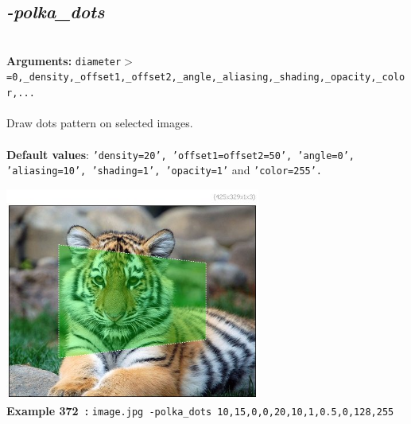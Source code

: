 \documentclass[a4paper,11pt,twoside]{book}
\begin{document}
\subsection{\emph{-polka\_dots} }\vspace*{-0.5em}
~\\\textbf{Arguments: } 
{\small \texttt{diameter$>$=0,\_density,\_offset1,\_offset2,\_angle,\_aliasing,\_shading,\_opacity,\_color,...}}\\~\\
Draw dots pattern on selected images.
~\\~\\\textbf{Default values}: {\small \texttt{'density=20', 'offset1=offset2=50', 'angle=0', 'aliasing=10', 'shading=1', 'opacity=1'} and \texttt{'color=255'.}}
\begin{center}\includegraphics[keepaspectratio=true,height=7cm,width=\textwidth]{img/gmic_def372.jpg}\\
{\footnotesize \textbf{Example 372~:} \texttt{image.jpg -polka\_dots 10,15,0,0,20,10,1,0.5,0,128,255}}
\end{center}
\end{document}
